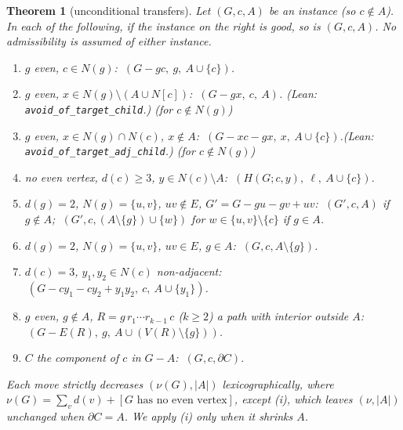 \documentclass[11pt]{amsart}
\newtheorem{theorem}{Theorem}[section]
\theoremstyle{definition}
\newcommand{\lean}[1]{\quad\emph{(Lean: \texttt{#1}.)}}
\begin{document}
\begin{theorem}[unconditional transfers]\label{thm:calculus}
Let $(G,c,A)$ be an instance (so $c\notin A$). In each of the following, if the instance on the
right is good, so is $(G,c,A)$. No admissibility is assumed of either instance.
\begin{enumerate}
\item[(a)] $g$ even, $c\in N(g)$: $\ (G-gc,\ g,\ A\cup\{c\})$.
\item[(b)] $g$ even, $x\in N(g)\setminus(A\cup N[c])$: $\ (G-gx,\ c,\ A)$.
\lean{avoid\_of\_target\_child} (for $c\notin N(g)$)
\item[(c)] $g$ even, $x\in N(g)\cap N(c)$, $x\notin A$:
$\ (G-xc-gx,\ x,\ A\cup\{c\})$.\lean{avoid\_of\_target\_adj\_child} (for $c\notin N(g)$)
\item[(d)] no even vertex, $d(c)\ge3$, $y\in N(c)\setminus A$: $\ (H(G;c,y),\ \ell,\ A\cup\{c\})$.
\item[(e)] $d(g)=2$, $N(g)=\{u,v\}$, $uv\notin E$, $G'=G-gu-gv+uv$: $\ (G',c,A)$ if $g\notin A$;
$\ (G',c,(A\setminus\{g\})\cup\{w\})$ for $w\in\{u,v\}\setminus\{c\}$ if $g\in A$.
\item[(f)] $d(g)=2$, $N(g)=\{u,v\}$, $uv\in E$, $g\in A$: $\ (G,c,A\setminus\{g\})$.
\item[(g)] $d(c)=3$, $y_1,y_2\in N(c)$ non-adjacent: $\ (G-cy_1-cy_2+y_1y_2,\ c,\ A\cup\{y_1\})$.
\item[(h)] $g$ even, $g\notin A$, $R=g\,r_1\cdots r_{k-1}\,c$ ($k\ge2$) a path with interior outside
$A$:
$\ (G-E(R),\ g,\ A\cup(V(R)\setminus\{g\}))$.
\item[(i)] $C$ the component of $c$ in $G-A$: $\ (G,c,\partial C)$.
\end{enumerate}
Each move strictly decreases $(\nu(G),|A|)$ lexicographically, where
$\nu(G)=\sum_vd(v)+[G\text{ has no even vertex}]$, except (i), which leaves $(\nu,|A|)$ unchanged
when $\partial C=A$. We apply (i) only when it shrinks $A$.
\end{theorem}
\end{document}
